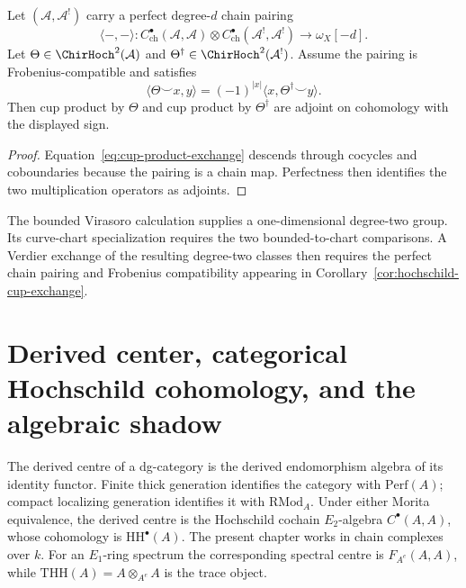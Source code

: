 \begin{corollary}
\label{cor:hochschild-cup-exchange}
Let $(\mathcal A,\mathcal A^!)$ carry a perfect degree-$d$ chain
pairing
\[
 \langle-,-\rangle\colon
 C^\bullet_{\mathrm{ch}}(\mathcal A,\mathcal A)
 \otimes
 C^\bullet_{\mathrm{ch}}(\mathcal A^!,\mathcal A^!)
 \longrightarrow\omega_X[-d].
\]
Let $\Theta\in\ChirHoch^2(\mathcal A)$ and
$\Theta^\dagger\in\ChirHoch^2(\mathcal A^!)$.  Assume the pairing is
Frobenius-compatible and satisfies
\begin{equation}\label{eq:cup-product-exchange}
 \langle\Theta\smile x,y\rangle
 =(-1)^{|x|}\langle x,\Theta^\dagger\smile y\rangle.
\end{equation}
Then cup product by $\Theta$ and cup product by
$\Theta^\dagger$ are adjoint on cohomology with the displayed sign.
\end{corollary}

\begin{proof}
Equation~\eqref{eq:cup-product-exchange} descends through cocycles and
coboundaries because the pairing is a chain map.  Perfectness then
identifies the two multiplication operators as adjoints.
\end{proof}

\begin{remark}\label{rem:cup-exchange-virasoro}
The bounded Virasoro calculation supplies a one-dimensional
degree-two group.  Its curve-chart specialization requires the two
bounded-to-chart comparisons.  A Verdier exchange of the resulting
degree-two classes then requires the perfect chain pairing and
Frobenius compatibility appearing in
Corollary~\ref{cor:hochschild-cup-exchange}.
\end{remark}

\section{Derived center, categorical Hochschild cohomology, and the algebraic shadow}
\label{sec:derived-center-hochschild-cochains}


The derived centre of a dg-category is the derived endomorphism
algebra of its identity functor.  Finite thick generation identifies
the category with $\mathrm{Perf}(A)$; compact localizing generation
identifies it with $\mathrm{RMod}_A$.  Under either Morita
equivalence, the derived centre is the Hochschild cochain
$E_2$-algebra $C^\bullet(A,A)$, whose cohomology is
$\mathrm{HH}^\bullet(A)$.  The present chapter works in chain
complexes over $k$.  For an $E_1$-ring spectrum the corresponding
spectral centre is $F_{A^e}(A,A)$, while
$\mathrm{THH}(A)=A\otimes_{A^e}A$ is the trace object.

